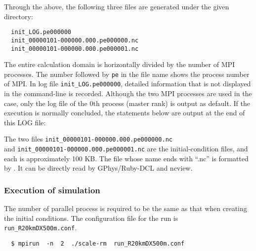 
Through the above, the following three files are generated under the given directory:
\begin{verbatim}
  init_LOG.pe000000
  init_00000101-000000.000.pe000000.nc
  init_00000101-000000.000.pe000001.nc
\end{verbatim}
The entire calculation domain is horizontally divided by the number of MPI processes.
The number followed by \verb|pe| in the file name shows the process number of MPI.
In log file \verb|init_LOG.pe000000|,
detailed information that is not displayed in the command-line is recorded.
Although the two MPI processes are used in the case,
only the log file of the 0th process (master rank) is output as default.
If the execution is normally concluded, the statements below are output at the end of this LOG file:


The two files
\verb|init_00000101-000000.000.pe000000.nc|\\ and \verb|init_00000101-000000.000.pe000001.nc| are the initial-condition files, and each is approximately 100 KB.
The file whose name ends with ``.nc''  is formatted by \netcdf.
It can be directly read by GPhys/Ruby-DCL and ncview.


\subsubsection{Execution of simulation} %

The number of parallel process is required to be the same as that when creating the initial conditions.
The configuration file for the run is \verb|run_R20kmDX500m.conf|.
\begin{verbatim}
  $ mpirun  -n  2  ./scale-rm  run_R20kmDX500m.conf
\end{verbatim}

